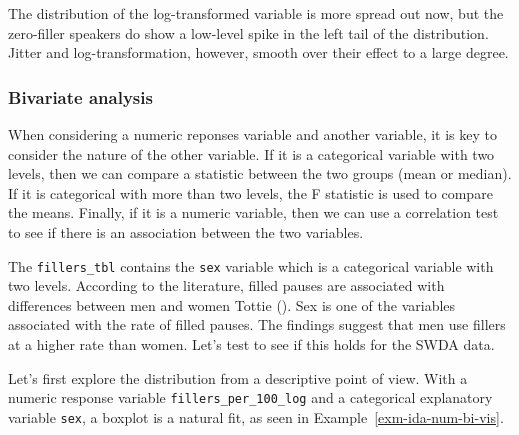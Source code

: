 \documentclass[
  letterpaper,
]{latex/krantz}
\theoremstyle{definition}
\theoremstyle{remark}
\begin{document}
The distribution of the log-transformed variable is more spread out now,
but the zero-filler speakers do show a low-level spike in the left tail
of the distribution. Jitter and log-transformation, however, smooth over
their effect to a large degree.

\subsubsection{Bivariate analysis}\label{bivariate-analysis}

When considering a numeric reponses variable and another variable, it is
key to consider the nature of the other variable. If it is a categorical
variable with two levels, then we can compare a statistic between the
two groups (mean or median). If it is categorical with more than two
levels, the F statistic is used to compare the means. Finally, if it is
a numeric variable, then we can use a correlation test to see if there
is an association between the two variables.

The \texttt{fillers\_tbl} contains the \texttt{sex} variable which is a
categorical variable with two levels. According to the literature,
filled pauses are associated with differences between men and women
Tottie (). Sex is one of the variables
associated with the rate of filled pauses. The findings suggest that men
use fillers at a higher rate than women. Let's test to see if this holds
for the SWDA data.

Let's first explore the distribution from a descriptive point of view.
With a numeric response variable \texttt{fillers\_per\_100\_log} and a
categorical explanatory variable \texttt{sex}, a boxplot is a natural
fit, as seen in Example~\ref{exm-ida-num-bi-vis}.
\end{document}
